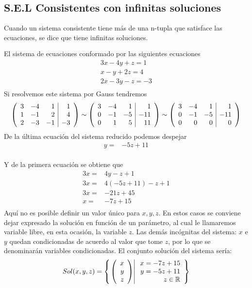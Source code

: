 \subsection{S.E.L Consistentes con infinitas soluciones}
Cuando un sistema consistente tiene más de una n-tupla que satisface las ecuaciones, se dice que tiene infinitas soluciones.

\begin{ejemplo}
El sistema de ecuaciones conformado por las siguientes ecuaciones 
\begin{align*}
3x-4y+z=1\\
x-y+2z=4\\
2x-3y-z=-3\\
\end{align*}
Si resolvemos este sistema por Gauss tendremos
\begin{align*}
\reducir{rrr|r}{
3&-4&1&1\\
1&-1&2&4\\
2&-3&-1&-3\\
}\sim
\reducir{rrr|r}{
3&-4&1&1\\
0&-1&-5&-11\\
0&1&5&11\\
}\sim
\reducir{rrr|r}{
3&-4&1&1\\
0&-1&-5&-11\\
0&0&0&0\\
}
\end{align*}
De la última ecuación del sistema reducido podemos despejar 
\begin{align*}
y=&-5z+11\\
\end{align*}

Y de la primera ecuación se obtiene que
\begin{align*}
3x=&4y-z+1\\
3x=&4(-5z+11)-z+1\\
3x=&-21z+45\\
x=&-7z+15\\
\end{align*}
Aquí no es posible definir un valor único para $x, y, z$. En estos casos se conviene dejar expresado la solución en función de un parámetro, al cual le llamaremos variable libre, en esta ocasión, la variable $z$. Las demás incógnitas del sistema: $x$ e $y$ quedan condicionadas de acuerdo al valor que tome $z$, por lo que se denominarán variables condicionadas. El conjunto solución del sistema sería:
\begin{align*}
Sol(x,y, z)=\llaves{\vectrtres{x}{y}{z}}{\begin{array}{r}x=-7z+15\\y=-5z+11\\z\in \dobler
\end{array}}
\end{align*}

\end{ejemplo}

